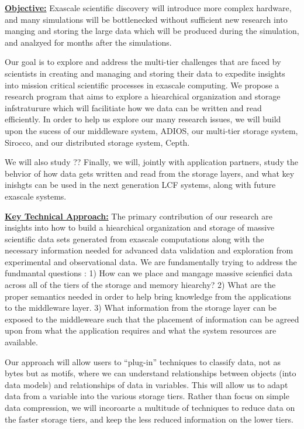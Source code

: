 \documentclass[11pt,letterpaper]{article}
\begin{document}
\underline{\textbf{Objective:}} Exascale scientific discovery will
introduce more complex hardware, and many simulations will be bottlenecked 
without sufficient new research into manging and storing the large data which will be
produced during the simulation, and analzyed for months after the simulations.

Our goal is to explore and address
the multi-tier challenges that are faced by scientists in creating and
managing and storing their data  to expedite insights into
mission critical scientific processes in exascale computing.
%
We propose a research program that aims to explore a hiearchical organization and storage infstraturure which will facilitiate 
how we data can be written and read efficiently. In order to help us explore our many research issues, we will build upon the
sucess of our middleware system, ADIOS, our multi-tier storage system, Sirocco, and our distributed storage system, Cepth.

%
We will also study ??
%
Finally, we will, jointly with application partners, study the behvior of how data gets written and read from the storage layers, and
what key inishgts can be used in the next generation LCF systems, along with future exascale systems.

\underline{\textbf{Key Technical Approach:}} The primary contribution of
our research are insights into how to build a hiearchical organization and storage
of massive scientific data sets generated from exascale computations along with 
the necessary information needed for advanced data validation and exploration from 
experimental and observational data. 
We are fundamentally trying to address the fundmantal questions : 1)  How can we 
place and mangage massive scienfici data across all of the tiers of the storage and memory
hiearchy? 2) What are the proper semantics needed in order to help bring knowledge from the applications
to the middleware layer. 3) What information from the storage layer can be exposed to the middleweare such
that the placement of information can be agreed upon from what the application requires and what the
system resources are available. 

Our approach will allow users to ``plug-in'' techniques to classify data, not as bytes but as motifs, where
we can understand relationships between objects (into data models) and relationships of data in variables.
This will allow us to adapt data from a variable into the various storage tiers. Rather than focus on simple data
compression, we will incoroarte a multitude of techniques to reduce data on the faster storage tiers, and keep the less
reduced information on the lower tiers.
\end{document}
